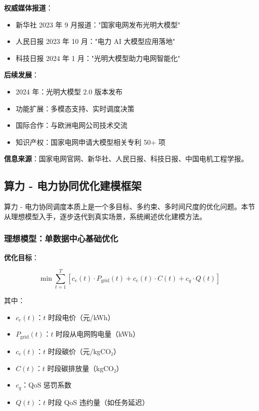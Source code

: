 \documentclass[12pt,a4paper]{article}
\begin{document}
\textbf{权威媒体报道}：

\begin{itemize}
    \item 新华社 2023 年 9 月报道："国家电网发布光明大模型"
    \item 人民日报 2023 年 10 月："电力 AI 大模型应用落地"
    \item 科技日报 2024 年 1 月："光明大模型助力电网智能化"
\end{itemize}

\textbf{后续发展}：

\begin{itemize}
    \item 2024 年：光明大模型 2.0 版本发布
    \item 功能扩展：多模态支持、实时调度决策
    \item 国际合作：与欧洲电网公司技术交流
    \item 知识产权：国家电网申请大模型相关专利 50+ 项
\end{itemize}

\textbf{信息来源}：国家电网官网、新华社、人民日报、科技日报、中国电机工程学报\cite{sgcc2023guangming,sgcc2024power,xinhua2023sgcc,people2023sgcc,sci2024sgcc}。

\subsection{算力 - 电力协同优化建模框架}

算力 - 电力协同调度本质上是一个多目标、多约束、多时间尺度的优化问题。本节从理想模型入手，逐步迭代到真实场景，系统阐述优化建模方法。

\subsubsection{理想模型：单数据中心基础优化}

\textbf{优化目标}：

\begin{equation}
\min \sum_{t=1}^{T} \left[ c_e(t) \cdot P_{\text{grid}}(t) + c_c(t) \cdot C(t) + c_q \cdot Q(t) \right]
\label{eq:obj-basic}
\end{equation}

其中：
\begin{itemize}
    \item $c_e(t)$：$t$ 时段电价（元/kWh）
    \item $P_{\text{grid}}(t)$：$t$ 时段从电网购电量（kWh）
    \item $c_c(t)$：$t$ 时段碳价（元/kgCO₂）
    \item $C(t)$：$t$ 时段碳排放量（kgCO₂）
    \item $c_q$：QoS 惩罚系数
    \item $Q(t)$：$t$ 时段 QoS 违约量（如任务延迟）
\end{itemize}
\end{document}

